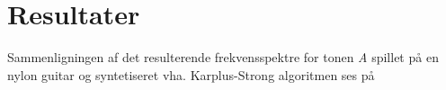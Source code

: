 \section{Resultater}

Sammenligningen af det resulterende frekvensspektre for tonen \textit{A} spillet på en nylon guitar og syntetiseret vha. Karplus-Strong algoritmen ses på 

